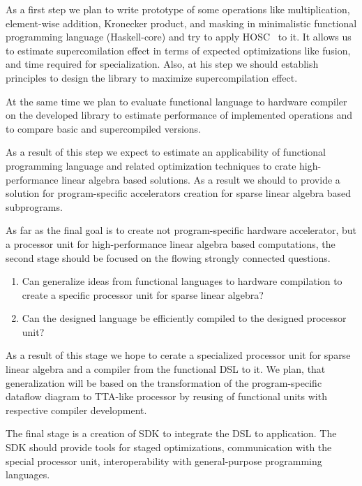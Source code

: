 \documentclass[10pt,conference]{IEEEtran}
\begin{document}
As a first step we plan to write prototype of some operations like multiplication, element-wise addition, Kronecker product, and masking in minimalistic functional programming language (Haskell-core) and try to apply HOSC~\cite{!!!} to it. 
It allows us to estimate supercomilation effect in terms of expected optimizations like fusion, and time required for specialization. 
Also, at his step we should establish principles to design the library to maximize supercompilation effect.

At the same time we plan to evaluate functional language to hardware compiler~\cite{funcHLS} on the developed library to estimate performance of implemented operations and to compare basic and supercompiled versions.

As a result of this step we expect to estimate an applicability of functional programming language and related optimization techniques to crate high-performance linear algebra based solutions. 
As a result we should to provide a solution for program-specific accelerators creation for sparse linear algebra based subprograms. 

As far as the final goal is to create not program-specific hardware accelerator, but a processor unit for high-performance linear algebra based computations, the second stage should be focused on the flowing strongly connected questions. 
\begin{enumerate}  
  \item Can generalize ideas from functional languages to hardware compilation to create a specific processor unit for sparse linear algebra?
  \item Can the designed language be efficiently compiled to the designed processor unit?
\end{enumerate}

As a result of this stage we hope to cerate a specialized processor unit for sparse linear algebra and a compiler from the functional DSL to it.
We plan, that generalization will be based on the transformation of the program-specific dataflow diagram to TTA-like processor by reusing of functional units with respective compiler development.


The final stage is a creation of SDK to integrate the DSL to application. 
The SDK should provide tools for staged optimizations, communication with the special processor unit, interoperability with general-purpose programming languages. 






\end{document}
